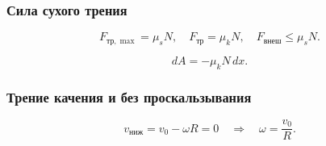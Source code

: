 \documentclass[12pt, a4paper]{article}
\begin{document}
\subsubsection*{Сила сухого трения}

\[
F_{\mathrm{тр},\max} = \mu_s N,
\quad
F_{\mathrm{тр}} = \mu_k N,
\quad
F_{\mathrm{внеш}} \le \mu_s N.
\]

\[
dA = -\mu_k N\, dx.
\]

\subsubsection*{Трение качения и без проскальзывания}

\[
v_{\mathrm{ниж}} = v_0 - \omega R = 0
\quad\Longrightarrow\quad
\omega = \frac{v_0}{R}.
\]
\end{document}
